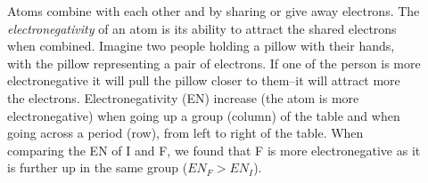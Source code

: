\documentclass[main.tex]{subfiles}
\begin{document}
\begin{description}
\item[] 
Atoms combine with each other and  by sharing or give away electrons. The \emph{electronegativity} of an atom is its ability to attract the shared electrons when combined. Imagine two people holding a pillow with their hands, with the pillow representing a pair of electrons. If one of the person is more electronegative it will pull the pillow closer to them--it will attract more the electrons. Electronegativity (EN) increase (the atom is more electronegative) when going up a group (column) of the table and when going across a period (row), from left to right of the table. When comparing the EN of I and F, we found that F is more electronegative as it is further up in the same group ($EN_{F}>EN_{I}$). 
\begin{marginfigure}%

\end{marginfigure}
\end{description}
\end{document}
